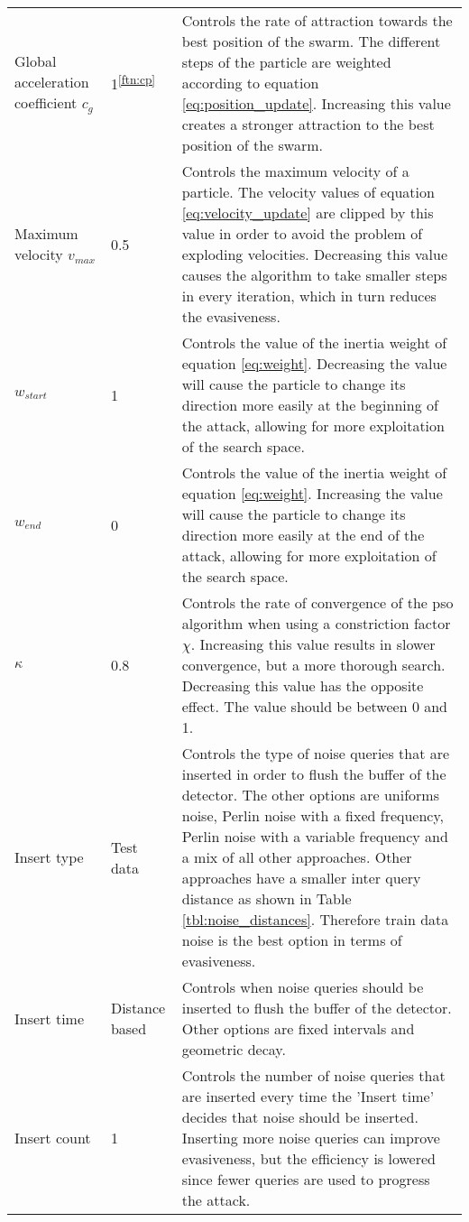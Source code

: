 \begin{longtable}{p{3cm}p{2.5cm}p{7cm}}
Global acceleration coefficient $c_g$ &1\textsuperscript{\ref{ftn:cp}} &Controls the rate of attraction towards the best position of the swarm. The different steps of the particle are weighted according to equation \ref{eq:position_update}. Increasing this value creates a stronger attraction to the best position of the swarm.\\
Maximum velocity $v_{max}$ &0.5 &Controls the maximum velocity of a particle. The velocity values of equation \ref{eq:velocity_update} are clipped by this value in order to avoid the problem of exploding velocities. Decreasing this value causes the algorithm to take smaller steps in every iteration, which in turn reduces the evasiveness.\\
$w_{start}$ &1 &Controls the value of the inertia weight of equation \ref{eq:weight}. Decreasing the value will cause the particle to change its direction more easily at the beginning of the attack, allowing for more exploitation of the search space.\\
$w_{end}$ &0 &Controls the value of the inertia weight of equation \ref{eq:weight}. Increasing the value will cause the particle to change its direction more easily at the end of the attack, allowing for more exploitation of the search space.\\
$\kappa$ &0.8 &Controls the rate of convergence of the \gls{pso} algorithm when using a constriction factor $\chi$. Increasing this value results in slower convergence, but a more thorough search. Decreasing this value has the opposite effect. The value should be between 0 and 1.\\
Insert type &Test data &Controls the type of noise queries that are inserted in order to flush the buffer of the detector. The other options are uniforms noise, Perlin noise with a fixed frequency, Perlin noise with a variable frequency and a mix of all other approaches. Other approaches have a smaller inter query distance as shown in Table \ref{tbl:noise_distances}. Therefore train data noise is the best option in terms of evasiveness.\\
Insert time &Distance based &Controls when noise queries should be inserted to flush the buffer of the detector. Other options are fixed intervals and geometric decay.\\
Insert count &1 &Controls the number of noise queries that are inserted every time the 'Insert time' decides that noise should be inserted. Inserting more noise queries can improve evasiveness, but the efficiency is lowered since fewer queries are used to progress the attack.\\

\end{longtable}
